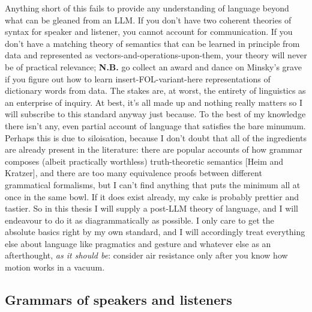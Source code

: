 \begin{fullwidth}
 Anything short of this fails to provide any understanding of language beyond what can be gleaned from an LLM. If you don't have two coherent theories of syntax for speaker and listener, you cannot account for communication. If you don't have a matching theory of semantics that can be learned in principle from data and represented as vectors-and-operations-upon-them, your theory will never be of practical relevance; \textbf{N.B.} go collect an award and dance on Minsky's grave if you figure out how to learn insert-FOL-variant-here representations of dictionary words from data. The stakes are, at worst, the entirety of linguistics as an enterprise of inquiry. At best, it's all made up and nothing really matters so I will subscribe to this standard anyway just because. To the best of my knowledge there isn't any, even partial account of language that satisfies the bare minumum. Perhaps this is due to siloisation, because I don't doubt that all of the ingredients are already present in the literature: there are popular accounts of how grammar composes (albeit practically worthless) truth-theoretic semantics [Heim and Kratzer], and there are too many equivalence proofs between different grammatical formalisms, but I can't find anything that puts the minimum all at once in the same bowl. If it does exist already, my cake is probably prettier and tastier. So in this thesis I will supply a post-LLM theory of language, and I will endeavour to do it as diagrammatically as possible. I only care to get the absolute basics right by my own standard, and I will accordingly treat everything else about language like pragmatics and gesture and whatever else as an afterthought, \emph{as it should be}: consider air resistance only after you know how motion works in a vacuum.

\subsection{Grammars of speakers and listeners}


\end{fullwidth}
